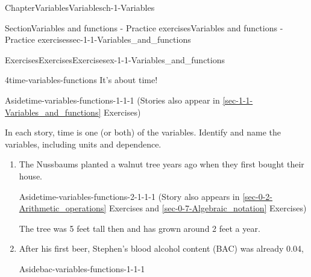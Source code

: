 \documentclass[twoside,11pt,]{book}
\newcommand{\xreffont}{\relax}
\numberwithin{equation}{section}
\newcommand{\amp}{&}
\begin{document}
\begin{chapterptx}{Chapter}{Variables}{}{Variables}{}{}{ch-1-Variables}
\begin{sectionptx}{Section}{Variables and functions - Practice exercises}{}{Variables and functions - Practice exercises}{}{}{sec-1-1-Variables_and_functions}
\begin{exercises-subsection-numberless}{Exercises}{Exercises}{}{Exercises}{}{}{ex-1-1-Variables_and_functions}
\begin{divisionexercise}{4}{}{}{time-variables-functions}
It's about time! \begin{aside}{Aside}{}{time-variables-functions-1-1-1}%
(Stories also appear in \hyperref[sec-1-1-Variables_and_functions]{{\xreffont\ref{sec-1-1-Variables_and_functions}}} Exercises)%
\end{aside}
 In each story, time is one (or both) of the variables. Identify and name the variables, including units and dependence.%
\begin{enumerate}[label=(\alph*),ref=\alph*]%
\item{}The Nussbaums planted a walnut tree years ago when they first bought their house. \begin{aside}{Aside}{}{time-variables-functions-2-1-1-1}%
(Story also appears in \hyperref[sec-0-2-Arithmetic_operations]{{\xreffont\ref{sec-0-2-Arithmetic_operations}}} Exercises and \hyperref[sec-0-7-Algebraic_notation]{{\xreffont\ref{sec-0-7-Algebraic_notation}}} Exercises)%
\end{aside}
 The tree was 5 feet tall then and has grown around 2 feet a year.%
\par
    \hspace{-2cm}
%
%
\item\label{bac-variables-functions}After his first beer, Stephen's blood alcohol content (BAC) was already 0.04, \begin{aside}{Aside}{}{bac-variables-functions-1-1-1}%

\end{aside}
\end{enumerate}
\end{divisionexercise}
\end{exercises-subsection-numberless}
\end{sectionptx}
\end{chapterptx}
\end{document}
